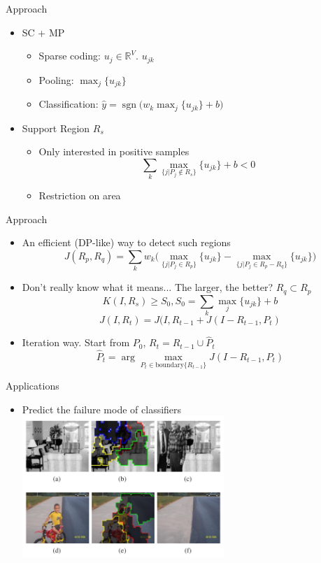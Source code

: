 \documentclass[12pt]{beamer}
\begin{document}
\begin{frame}{Approach}
    \begin{itemize}
        \item SC + MP
        \begin{itemize}
            \item Sparse coding: $u_j \in \mathbb{R}^V$. $u_{jk}$
            \item Pooling: $\max_j \{u_{jk}\}$
            \item Classification: $\hat{y} = \mathop{sgn} \Big( w_k \max_j \{u_{jk}\} + b \Big)$
        \end{itemize}
        \item Support Region $R_s$
        \begin{itemize}
            \item Only interested in positive samples
            \[ \sum_k \max_{\{j|P_j \notin R_s \}} \{ u_{jk} \} + b < 0 \]
            \item Restriction on area
        \end{itemize}
    \end{itemize}
\end{frame}

\begin{frame}{Approach}
    \begin{itemize}
        \item An efficient (DP-like) way to detect such regions
        \[ J(R_p, R_q) = \sum_k w_k \Big( \max_{\{j|P_j\in R_p\}} \{u_{jk}\} - \max_{\{j|P_j\in R_p-R_q\}} \{u_{jk}\} \Big) \]
        \item Don't really know what it means... The larger, the better? $R_q \subset R_p$
        \[ K(I, R_s) \geq S_0, S_0 = \sum_k \max_j \{u_{jk}\} + b \]
        \[ J(I, R_t) = J(I, R_{t - 1} + J(I - R_{t - 1}, P_t) \]
        \item Iteration way. Start from $P_0$, $R_t = R_{t - 1} \cup \hat{P}_t$
        \[ \hat{P}_t  = \arg \max_{P_t \in \text{boundary}\{R_{t-1}\}} J(I - R_{t - 1}, P_t) \]
    \end{itemize}
\end{frame}

\begin{frame}{Applications}
    \begin{itemize}
        \item Predict the failure mode of classifiers
        \medskip
        \includegraphics[width=0.6\textwidth]{fig2.png} \\
    \end{itemize}
\end{frame}
\end{document}
